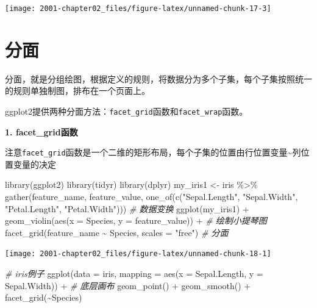\documentclass[
]{book}
\newenvironment{Shaded}{\begin{snugshade}}{\end{snugshade}}
\newcommand{\AttributeTok}[1]{\textcolor[rgb]{0.77,0.63,0.00}{#1}}
\newcommand{\CommentTok}[1]{\textcolor[rgb]{0.56,0.35,0.01}{\textit{#1}}}
\newcommand{\FunctionTok}[1]{\textcolor[rgb]{0.00,0.00,0.00}{#1}}
\newcommand{\NormalTok}[1]{#1}
\newcommand{\OtherTok}[1]{\textcolor[rgb]{0.56,0.35,0.01}{#1}}
\newcommand{\SpecialCharTok}[1]{\textcolor[rgb]{0.00,0.00,0.00}{#1}}
\newcommand{\StringTok}[1]{\textcolor[rgb]{0.31,0.60,0.02}{#1}}
\begin{document}
\begin{center}\texttt{[image: 2001-chapter02\_files/figure-latex/unnamed-chunk-17-3]} \end{center}

\hypertarget{ux5206ux9762}{%
\section{分面}\label{ux5206ux9762}}

分面，就是分组绘图，根据定义的规则，将数据分为多个子集，每个子集按照统一的规则单独制图，排布在一个页面上。

ggplot2提供两种分面方法：\texttt{facet\_grid}函数和\texttt{facet\_wrap}函数。

\textbf{1. facet\_grid函数}

注意\texttt{facet\_grid}函数是一个二维的矩形布局，每个子集的位置由行位置变量\textasciitilde 列位置变量的决定

\begin{Shaded}
\begin{Highlighting}[]
\FunctionTok{library}\NormalTok{(ggplot2)}
\FunctionTok{library}\NormalTok{(tidyr)}
\FunctionTok{library}\NormalTok{(dplyr)}
\NormalTok{my\_iris1 }\OtherTok{\textless{}{-}}\NormalTok{ iris }\SpecialCharTok{\%\textgreater{}\%} \FunctionTok{gather}\NormalTok{(feature\_name, feature\_value, }\FunctionTok{one\_of}\NormalTok{(}\FunctionTok{c}\NormalTok{(}\StringTok{"Sepal.Length"}\NormalTok{, }\StringTok{"Sepal.Width"}\NormalTok{, }\StringTok{"Petal.Length"}\NormalTok{, }\StringTok{"Petal.Width"}\NormalTok{)))  }\CommentTok{\# 数据变换}
\FunctionTok{ggplot}\NormalTok{(my\_iris1) }\SpecialCharTok{+} 
  \FunctionTok{geom\_violin}\NormalTok{(}\FunctionTok{aes}\NormalTok{(}\AttributeTok{x =}\NormalTok{ Species, }\AttributeTok{y =}\NormalTok{ feature\_value)) }\SpecialCharTok{+}  \CommentTok{\# 绘制小提琴图}
  \FunctionTok{facet\_grid}\NormalTok{(feature\_name }\SpecialCharTok{\textasciitilde{}}\NormalTok{ Species, }\AttributeTok{scales =} \StringTok{"free"}\NormalTok{)  }\CommentTok{\# 分面}
\end{Highlighting}
\end{Shaded}

\begin{center}\texttt{[image: 2001-chapter02\_files/figure-latex/unnamed-chunk-18-1]} \end{center}

\begin{Shaded}
\begin{Highlighting}[]
\CommentTok{\# iris例子}
\FunctionTok{ggplot}\NormalTok{(}\AttributeTok{data =}\NormalTok{ iris, }\AttributeTok{mapping =} \FunctionTok{aes}\NormalTok{(}\AttributeTok{x =}\NormalTok{ Sepal.Length, }\AttributeTok{y =}\NormalTok{ Sepal.Width)) }\SpecialCharTok{+}  \CommentTok{\# 底层画布}
  \FunctionTok{geom\_point}\NormalTok{() }\SpecialCharTok{+}
  \FunctionTok{geom\_smooth}\NormalTok{() }\SpecialCharTok{+}
  \FunctionTok{facet\_grid}\NormalTok{(}\SpecialCharTok{\textasciitilde{}}\NormalTok{Species)}
\end{Highlighting}
\end{Shaded}
\end{document}
